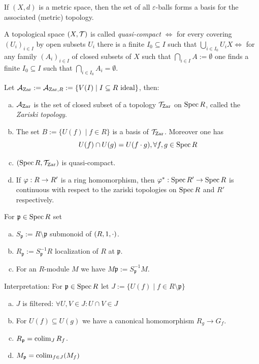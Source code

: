 \documentclass[a4paper]{report}
\begin{document}
\begin{exmp*}If $(X, d)$ is a metric space, then the set of all $\varepsilon$-balls forms a basis for the associated (metric) topology.
\end{exmp*}
\begin{defi}
A topological space $(X, \mathcal{T})$ is called \emph{quasi-compact} $\iff$ for every covering $(U_{i})_{i \in I}$ by open subsets $U_{i}$ there is a finite $I_{0 } \subseteq I$ such that $\bigcup_{i \in I_{0}}U_{i} X \iff $ for any family $(A_{i})_{i \in I}$ of closed subsets of $X$ such that $\bigcap_{i \in I}A := \emptyset$ one finds a finite $I_{0} \subseteq I$ such that $\bigcap_{i \in I_{0}}A_{i} = \emptyset$.
\end{defi}

\begin{thm-defi}
  Let $\mathcal{A}_{\operatorname{Zar}} := \mathcal{A}_{\operatorname{Zar}, R}:= \{V(I) \mid I \subseteq R \text{ ideal}\}$, then:
  \begin{enumerate}[(a)]
    \item $\mathcal{A}_{\operatorname{Zar}}$ is the set of closed subset of a topology $\mathcal{T}_{\operatorname{Zar}}$ on $\operatorname{Spec} R$, called the \emph{Zariski topology}.
    \item The set $B:= \{U(f) \mid f \in R\}$ is a basis of $\mathcal{T}_{\operatorname{Zar}}$. Moreover one has \[U(f) \cap U(g) = U(f \cdot g), \forall f,g \in \operatorname{Spec} R\]
    \item $(\operatorname{Spec} R, \mathcal{T}_{\operatorname{Zar}})$ is quasi-compact.
          \item If $\varphi: R \to R'$ is a ring homomorphism, then $\varphi^{*}: \operatorname{Spec} R' \to \operatorname{Spec} R$ is continuous with respect to the zariski topologies on $\operatorname{Spec} R$ and $R'$ respectively.
  \end{enumerate}
\end{thm-defi}

\begin{defi}
  For $\mathfrak p \in \operatorname{Spec} R$ set
  \begin{enumerate}[(a)]
    \item $S_{\mathfrak p} := R \setminus \mathfrak p$ submonoid of $(R, 1, \cdot)$.
    \item $R_{\mathfrak p}:= S^{-1}_{\mathfrak p}R$ localization of $R$ at $\mathfrak p$.
    \item For an $R$-module $M$ we have $M\mathfrak p := S_{\mathfrak p}^{-1}M$.
  \end{enumerate}
\end{defi}
Interpretation: For $\mathfrak p \in \operatorname{Spec} R$ let $J:= \{U(f) \mid f \in R \setminus \mathfrak p\}$
\begin{prop}[Exer]
\begin{enumerate}[(a)]
  \item $J$ is filtered: $\forall U, V \in J: U \cap V \in J$
  \item For $U(f) \subseteq U(g)$ we have a canonical homomorphism $R_{g} \to G_{f}$.
  \item $R_{\mathfrak p} = \operatorname*{colim}_{J} R_{f}$.
  \item $M_{\mathfrak p} = \operatorname*{colim}_{f \in J} (M_{f})$
\end{enumerate}
\end{prop}
\end{document}
